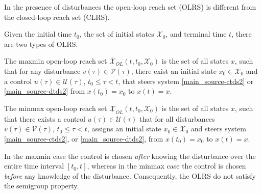 \documentclass[letterpaper,10pt,english]{sphinxmanual}
\begin{document}
In the presence of disturbances the open-loop reach set (OLRS) is
different from the closed-loop reach set (CLRS).

Given the initial time $t_0$, the set of initial states
${\mathcal X}_0$, and terminal time $t$, there are two types
of OLRS.

The maxmin open-loop reach set
$\overline{{\mathcal X}}_{OL}(t, t_0, {\mathcal X}_0)$ is the set
of all states $x$, such that for any disturbance
$v(\tau)\in{\mathcal V}(\tau)$, there exist an initial state
$x_0\in{\mathcal X}_0$ and a control
$u(\tau)\in{\mathcal U}(\tau)$, $t_0\leqslant\tau<t$, that
steers system \eqref{main_source-ctds2} or \eqref{main_source-dtds2} from $x(t_0)=x_0$ to
$x(t)=x$.

The minmax open-loop reach set
$\underline{{\mathcal X}}_{OL}(t, t_0, {\mathcal X}_0)$ is the set
of all states $x$, such that there exists a control
$u(\tau)\in{\mathcal U}(\tau)$ that for all disturbances
$v(\tau)\in{\mathcal V}(\tau)$, $t_0\leqslant\tau<t$,
assigns an initial state $x_0\in{\mathcal X}_0$ and steers system
\eqref{main_source-ctds2}, or \eqref{main_source-dtds2}, from $x(t_0)=x_0$ to $x(t)=x$.

In the maxmin case the control is chosen
\emph{after} knowing the disturbance over the entire time interval
$[t_0, t]$, whereas in the minmax case the control is chosen
\emph{before} any knowledge of the disturbance. Consequently, the OLRS do not
satisfy the semigroup property.
\end{document}
